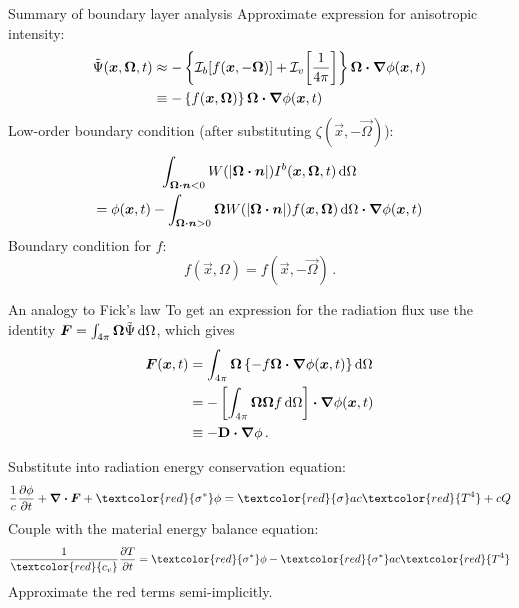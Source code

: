 \documentclass{beamer}
\begin{document}
\begin{frame}{Summary of boundary layer analysis}
  Approximate expression for anisotropic intensity:
  \begin{align*}
    \tilde\Psi(\bm{x}, \bm{\Omega}, t)
    &\approx
    - \left\{ \mathcal{I}_{b}\!\left[ f(\bm{x}, -\bm{\Omega}) \right]
    + \mathcal{I}_{v}\!\left[ \frac1{4\pi} \right] \right\}
   \bm{\Omega}\bm{\cdot} \bm{\nabla} \phi(\bm{x},t)
    \\
    &\equiv -\left\{ f(\bm{x}, \bm{\Omega}) \right\}
    \bm{\Omega}\bm{\cdot} \bm{\nabla} \phi(\bm{x},t)
  \end{align*}
  Low-order boundary condition (after substituting $\zeta(\vec{x},
  -\vec{\Omega})$):
  \begin{multline*}
  \int_{\bm{\Omega}\bm{\cdot} \bm{n} < 0} W(\left| \bm{\Omega}\bm{\cdot} \bm{n} \right|)
  I^b(\bm{x},\bm{\Omega},t) \mathop{}\!\mathrm{d}\Omega
  \\ = \phi(\bm{x},t)
  - \int_{\bm{\Omega}\bm{\cdot} \bm{n} > 0} \bm{\Omega}
  W(\left| \bm{\Omega}\bm{\cdot} \bm{n} \right|) f(\bm{x},\bm{\Omega}) \mathop{}\!\mathrm{d}\Omega
  \bm{\cdot} \bm{\nabla} \phi(\bm{x},t)
  \end{multline*}
  Boundary condition for $f$:
  \begin{equation*}
    f(\vec{x}, \Omega) = f(\vec{x}, -\vec{\Omega})\,.
  \end{equation*}
\end{frame}

\begin{frame}{An analogy to Fick's law}
  To get an expression for the radiation flux use the
  identity
  $\bm{F} = \int_{4\pi}\bm{\Omega} \tilde \Psi \mathop{}\!\mathrm{d}\Omega$, which gives
  \begin{align*}
    \bm{F}(\bm{x}, t)
    &= \int_{4\pi}\bm{\Omega} \left\{
    -f \bm{\Omega}\bm{\cdot} \bm{\nabla} \phi(\bm{x},t) \right\} \mathop{}\!\mathrm{d}\Omega
    \\
    &= - \left[ \int_{4\pi}\bm{\Omega} \bm{\Omega} f \mathop{}\!\mathrm{d}\Omega\right]
    \bm{\cdot} \bm{\nabla} \phi(\bm{x},t) 
    \\
      &\equiv -\mathbf{D} \bm{\cdot} \bm{\nabla} \phi \,.
  \end{align*}

  Substitute into radiation energy conservation equation:
\begin{equation*}
  \frac{1}{c} \pder{\phi}{t}
  + \del \vd \vec{F} + \textcolor{red}{\sigma^*} \phi
  = \textcolor{red}{\sigma} ac\textcolor{red}{T^4}
  + c Q
\end{equation*}
Couple with the material energy balance equation:
\begin{equation*}
  \frac{1}{\textcolor{red}{c_v}}\pder{T}{t} = \textcolor{red}{\sigma^*} \phi -
  \textcolor{red}{\sigma^*} ac\textcolor{red}{T^4}
\end{equation*}
Approximate the red terms semi-implicitly.
\end{frame}
\end{document}
